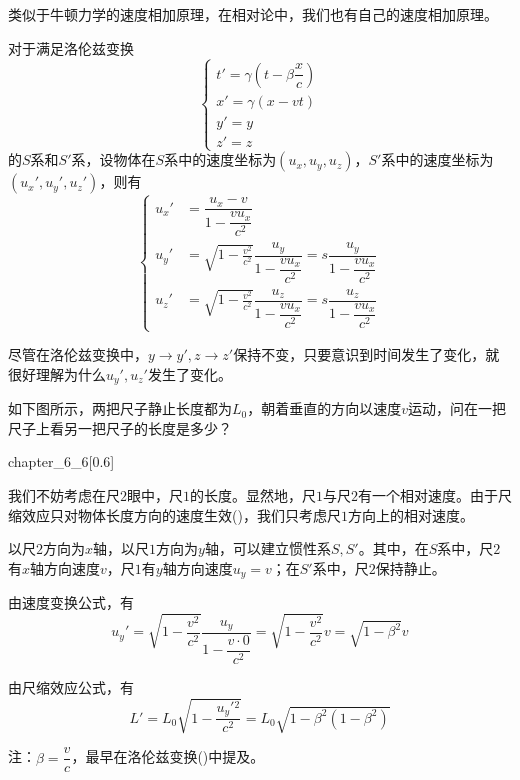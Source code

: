 \subsection[速度变换]{}
类似于牛顿力学的速度相加原理，在相对论中，我们也有自己的速度相加原理。
\begin{law}
	对于满足洛伦兹变换
	\[\left\{\begin{array}{l}
		t'=\gamma(t-\beta\dfrac{x}{c})\\
		x'=\gamma(x-vt)\\
		y'=y\\
		z'=z
	\end{array}\right.\]
	的$S$系和$S'$系，设物体在$S$系中的速度坐标为$(u_x,u_y,u_z)$，$S'$系中的速度坐标为$(u_x',u_y',u_z')$，则有
    \[
    \left\{\begin{aligned}
    	u_x'&=\dfrac{u_x-v}{1-\dfrac{vu_x}{c^2}}\\[1ex]
    	u_y'&=\sqrt{1-\frac{v^2}{c^2}}\dfrac{u_y}{1-\dfrac{vu_x}{c^2}}=s\dfrac{u_y}{1-\dfrac{vu_x}{c^2}}\\[1ex]
    	u_z'&=\sqrt{1-\frac{v^2}{c^2}}\dfrac{u_z}{1-\dfrac{vu_x}{c^2}}=s\dfrac{u_z}{1-\dfrac{vu_x}{c^2}}
    \end{aligned}\right.
    \]
\end{law}
尽管在洛伦兹变换中，$y\rightarrow y',z\rightarrow z'$保持不变，只要意识到时间发生了变化，就很好理解为什么$u_y',u_z'$发生了变化。
\begin{ex}
如下图所示，两把尺子静止长度都为$L_0$，朝着垂直的方向以速度$v$运动，问在一把尺子上看另一把尺子的长度是多少？    
    \begin{singlefigure}{chapter_6_6}[0.6]        
    \end{singlefigure}
\end{ex}
\begin{so}
	
	我们不妨考虑在尺$2$眼中，尺$1$的长度。显然地，尺$1$与尺$2$有一个相对速度。由于尺缩效应只对物体长度方向的速度生效()，我们只考虑尺$1$方向上的相对速度。
	
	以尺$2$方向为$x$轴，以尺$1$方向为$y$轴，可以建立惯性系$S,S'$。其中，在$S$系中，尺$2$有$x$轴方向速度$v$，尺$1$有$y$轴方向速度$u_y=v$；在$S'$系中，尺$2$保持静止。
	
	由速度变换公式，有
	\[u_y'=\sqrt{1-\dfrac{v^2}{c^2}}\dfrac{u_y}{1-\dfrac{v\cdot 0}{c^2}}=\sqrt{1-\dfrac{v^2}{c^2}}v=\sqrt{1-\beta^2}v\]
    
    由尺缩效应公式，有
    \[L'=L_0\sqrt{1-\dfrac{u_y'{}^2}{c^2}}=L_0\sqrt{1-\beta^2(1-\beta^2)}\]
    
    注：$\beta=\dfrac{v}{c}$，最早在洛伦兹变换()中提及。

\end{so}
